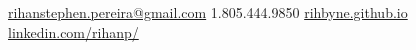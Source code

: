 \documentclass[11pt,a4paper]{article}
\begin{document}
\sloppy  %



\nobreakvspace{0.3em}  %

\noindent\href{mailto:rihanstephen.dot.pereira.at.gmail.dot.com}{rihanstephen.pereira\mbox{}@\mbox{}gmail.com}\sbull
\textsmaller{+}1.805.444.9850\sbull
\href{https://rihbyne.github.io}{rihbyne.github.io}\sbull
\href{https://linkedin.com/in/rihanp/}{linkedin.com/rihanp/}

\spacedhrule{0.9em}{-0.4em}  %

%
%
%
\end{document}
